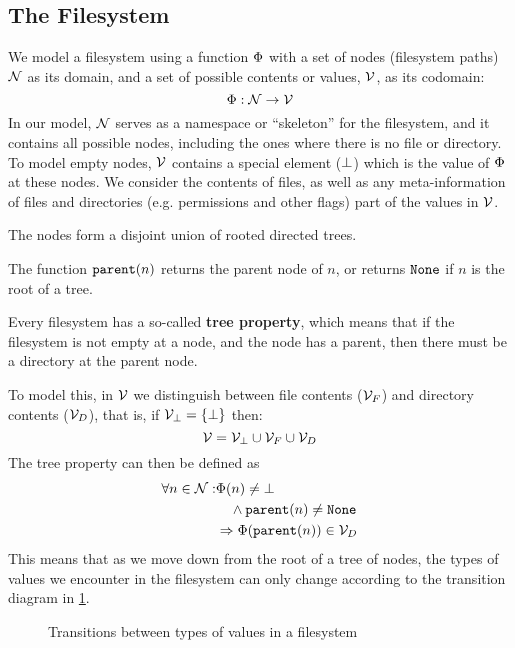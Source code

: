 
\subsection{The Filesystem}


We model a filesystem using a function $\Phi$ with a set of nodes (filesystem paths) $\mathcal{N}$ as its domain,
and a set of possible contents or values, $\mathcal{V}$, as its codomain:
\[ \Phi : \mathcal{N} \rightarrow \mathcal{V} \] 
In our model, $\mathcal{N}$ 
serves as a namespace or ``skeleton'' for the filesystem, and it
contains all possible nodes, including the ones where there is no file or directory.
To model empty nodes, $\mathcal{V}$ 
contains a special element ($\bot$) which is the value of $\Phi$ at these nodes.
We consider the contents of files, as well as any meta-information of files
and directories (e.g. permissions and other flags) part of the values in $\mathcal{V}$.


The nodes form a disjoint union of rooted directed trees.
\begin{mydef}
The function $\mathtt{parent}(n)$ returns the parent node of $n$, or
returns $\mathtt{None}$ if $n$ is the root of a tree.
\end{mydef}

Every filesystem has a so-called \textbf{tree property}, which means that
if the filesystem is not empty at a node, and the node has a parent,
then there must be a directory at the parent node.

To model this, in $\mathcal{V}$ we distinguish between 
file contents ($\mathcal{V}_{F}$) and directory contents ($\mathcal{V}_{D}$), that is,
if $\mathcal{V}_{\bot} = \{\bot\}$ then:
\[ \mathcal{V} = \mathcal{V}_{\bot} \cup \mathcal{V}_{F} \cup \mathcal{V}_{D} \]
The tree property can then be defined as
\begin{align*}
\forall n\in\setn: &\FS(n) \neq \empt \\ %
&\quad\wedge \parent(n) \neq \topnode \\
&\Rightarrow \FS(\parent(n)) \in \setd 
\end{align*}
This means that as we move down from the root of a tree of nodes,
the types of values we encounter in the filesystem can only change according to the
transition diagram in \cref{fig_transition}.

\begin{figure}[htb]

\caption{Transitions between types of values in a filesystem}\label{fig_transition}
\end{figure}

